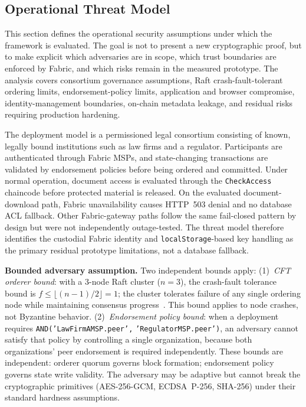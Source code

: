 \documentclass{ieeeaccess}
\begin{document}
\subsection{Operational Threat Model}
\label{sec:threat_model}

This section defines the operational security assumptions under which
the framework is evaluated. The goal is not to present a new
cryptographic proof, but to make explicit which adversaries are in
scope, which trust boundaries are enforced by Fabric, and which risks
remain in the measured prototype. The analysis covers consortium
governance assumptions, Raft crash-fault-tolerant ordering limits,
endorsement-policy limits, application and browser compromise,
identity-management boundaries, on-chain metadata leakage, and
residual risks requiring production hardening.

The deployment model is a permissioned legal consortium consisting of
known, legally bound institutions such as law firms and a regulator.
Participants are authenticated through Fabric MSPs, and state-changing
transactions are validated by endorsement policies before being
ordered and committed. Under normal operation, document access is
evaluated through the \texttt{CheckAccess} chaincode before protected
material is released. On the evaluated document-download path, Fabric
unavailability causes HTTP~503 denial and no database ACL fallback. Other
Fabric-gateway paths follow the same fail-closed pattern by design but
were not independently outage-tested. The threat
model therefore identifies the custodial Fabric identity and
\texttt{localStorage}-based key handling as the primary residual
prototype limitations, not a database fallback.

\textbf{Bounded adversary assumption.} Two independent bounds apply:
(1)~\emph{CFT orderer bound}: with a 3-node Raft cluster ($n=3$),
the crash-fault tolerance bound is $f \leq \lfloor(n-1)/2\rfloor =
1$; the cluster tolerates failure of any single ordering node while
maintaining consensus progress~\cite{Ongaro2014}. This bound applies
to node crashes, not Byzantine behavior. (2)~\emph{Endorsement
policy bound}: when a deployment requires
\texttt{AND(}\allowbreak\texttt{'LawFirmAMSP.peer',}\allowbreak
\texttt{'RegulatorMSP.peer')}, an adversary
cannot satisfy that policy by controlling a single organization,
because both organizations' peer endorsement is required
independently. These bounds are independent: orderer
quorum governs block formation; endorsement policy governs state
write validity. The adversary may be adaptive but cannot break the
cryptographic primitives (AES-256-GCM, ECDSA~P-256, SHA-256) under
their standard hardness assumptions.
\end{document}
